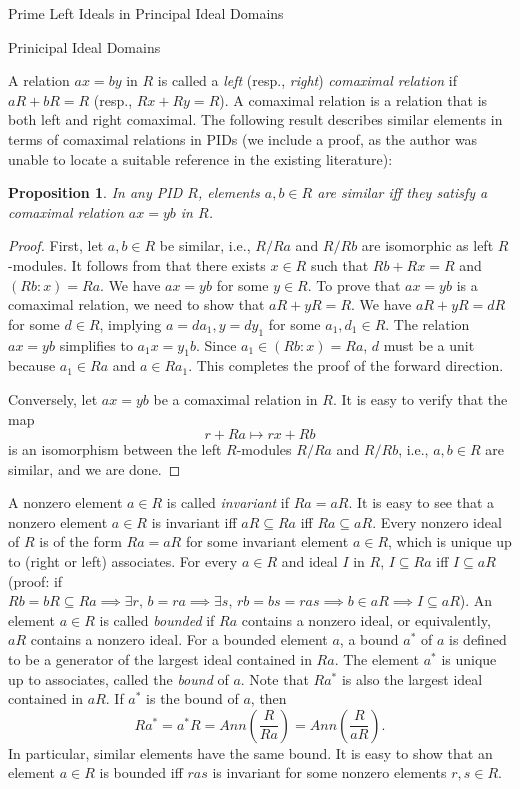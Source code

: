 \documentclass[11pt,a4paper]{article}
\theoremstyle{theorem}
\newtheorem{proposition}[theorem]{Proposition}
\numberwithin{equation}{section}
\begin{document}
\begin{section}{Prime Left Ideals in Principal Ideal Domains}
\begin{subsection}{Prinicipal Ideal Domains}
	 
	  A relation \(ax = by\) in \(R\) is called a \textit{left} (resp., \textit{right}) \textit{comaximal relation} if \(aR+bR = R\)  (resp., \(Rx+Ry = R\)). A comaximal relation is a relation that is both left and right comaximal. 	 The following result describes  similar elements in terms of comaximal relations  in PIDs (we include a proof, as the author was unable to locate a suitable reference in the existing literature):
	  \begin{proposition}\label{prop: similarity in PID}
	  	In any PID \(R\), elements \(a,b\in R\) are similar iff they satisfy a comaximal relation \(ax=yb\) in \(R\).
	  \end{proposition}
	  \begin{proof}
	  	First, let \(a,b\in R\) be similar, i.e., \(R/Ra\) and \(R/Rb\) are isomorphic as left \(R\)-modules. It follows from \cite[Proposition 1.3.6]{cohn2006free} that there exists \(x\in R\) such that  \(Rb + Rx = R \) and  \((Rb:x) = Ra\). We have \(ax = yb\) for some \(y\in R\). To prove that \(ax = yb\) is a comaximal relation, we need to show that \(aR+yR=R\). We have \(aR+yR = dR\) for some \(d\in R\), implying \(a=da_1, y=dy_1\) for some \(a_1,d_1\in R\). The relation \(ax = yb\) simplifies to \(a_1x = y_1b\). Since \(a_1\in (Rb:x) = Ra\), \(d\) must be a unit because \(a_1\in Ra\) and \(a\in Ra_1\). This completes the proof of the forward direction. 
	  	
	  	Conversely, let  \(ax=yb\) be a comaximal relation in \(R\). It is easy to verify that the map 
	  	\[
	  	r+Ra\mapsto rx+Rb 
	  	\]
	  	is an isomorphism between
	  	the left \(R\)-modules \(R/Ra\) and \(R/Rb\), i.e.,  \(a,b\in R\) are similar, and we are done. 
	  \end{proof}	
	 
	 A nonzero element \(a\in R\) is called \textit{invariant} if \(Ra = aR\).  It is easy to see that a nonzero element \(a\in R\) is invariant iff \(aR\subseteq Ra\) iff \(Ra\subseteq aR\). Every nonzero ideal of \(R\) is of the form \(Ra=aR\) for some invariant element \(a\in R\), which is unique up to (right or left) associates. For every \(a\in R\) and ideal \(I\) in \(R\), \(I\subseteq Ra\) iff \(I\subseteq aR\) (proof: if \(Rb=bR\subseteq Ra\implies \exists r,\, b=ra \implies\exists s,\, rb = bs=ras\implies b\in aR\implies I\subseteq aR\)). An element \(a\in R\) is called \textit{bounded} if \(Ra\) contains a nonzero ideal, or equivalently,  \(aR\) contains a nonzero ideal. For a bounded element \(a\), a bound \(a^*\) of \(a\) is defined to be a generator of the largest ideal contained in \(Ra\). The element \(a^*\) is unique up to associates, called the \textit{bound} of \(a\). Note that \(Ra^*\) is also the largest ideal contained in \(aR\). If \(a^*\) is the bound of \(a\), then
	 \[
	 	Ra^* = a^*R = Ann(\frac{R}{Ra}) = Ann(\frac{R}{aR}).
	  \] 
	 In particular, similar elements have the same bound. It is easy to show that an element \(a\in R\) is bounded iff \(ras\) is invariant for some nonzero elements \(r,s\in R\).  
 	

\end{subsection}
\end{section}
\end{document}
